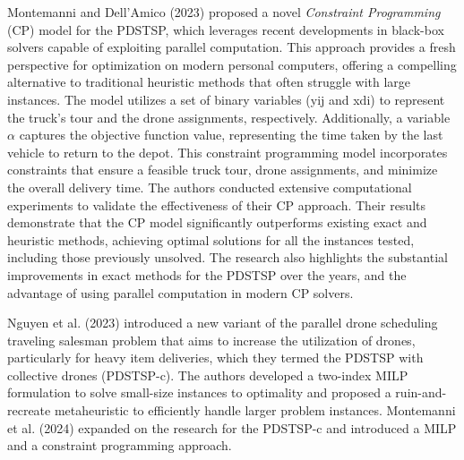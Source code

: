 \documentclass{article}
\begin{document}
	\par
	Montemanni and Dell’Amico (2023) \cite{Montemanni2023} proposed a novel \textit{Constraint Programming} (CP) model for the PDSTSP, which leverages recent developments in black-box solvers capable of exploiting parallel computation. This approach provides a fresh perspective for optimization on modern personal computers, offering a compelling alternative to traditional heuristic methods that often struggle with large instances. The model utilizes a set of binary variables (yij and xdi) to represent the truck's tour and the drone assignments, respectively. Additionally, a variable $\alpha$ captures the objective function value, representing the time taken by the last vehicle to return to the depot. This constraint programming model incorporates constraints that ensure a feasible truck tour, drone assignments, and minimize the overall delivery time. The authors conducted extensive computational experiments to validate the effectiveness of their CP approach. Their results demonstrate that the CP model significantly outperforms existing exact and heuristic methods, achieving optimal solutions for all the instances tested, including those previously unsolved. The research also highlights the substantial improvements in exact methods for the PDSTSP over the years, and the advantage of using parallel computation in modern CP solvers.
	\par
	Nguyen et al. (2023) \cite{Nguyen2023} introduced a new variant of the parallel drone scheduling traveling salesman problem that aims to increase the utilization of drones, particularly for heavy item deliveries, which they termed the PDSTSP with collective drones (PDSTSP-c).
	The authors developed a two-index MILP formulation to solve small-size instances to optimality and proposed a ruin-and-recreate metaheuristic to efficiently handle larger problem instances. Montemanni et al. (2024) expanded on the research for the PDSTSP-c and introduced a MILP and a constraint programming approach.
	\par
\end{document}
